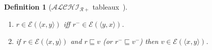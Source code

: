 \documentclass{article}
\newtheorem{mydef}{Definition}
\begin{document}
\begin{mydef}[$\mathcal{ALCHI_{R+}}$ tableaux~\cite{horrocks1999description}]
\begin{enumerate}
\item $r \in \mathcal{E}(\langle x,y\rangle)$ iff  $ r^-\in \mathcal{E}(\langle y,x\rangle)$.
\item if $ r\in \mathcal{E}(\langle x,y\rangle)$ and $r\sqsubseteq v$ (or $r^-\sqsubseteq v^-$) then  $v \in \mathcal{E}(\langle x,y\rangle)$.
\end{enumerate}
\label{def:alchir}
\end{mydef}


% 
% 
% 
% 
\end{document}
